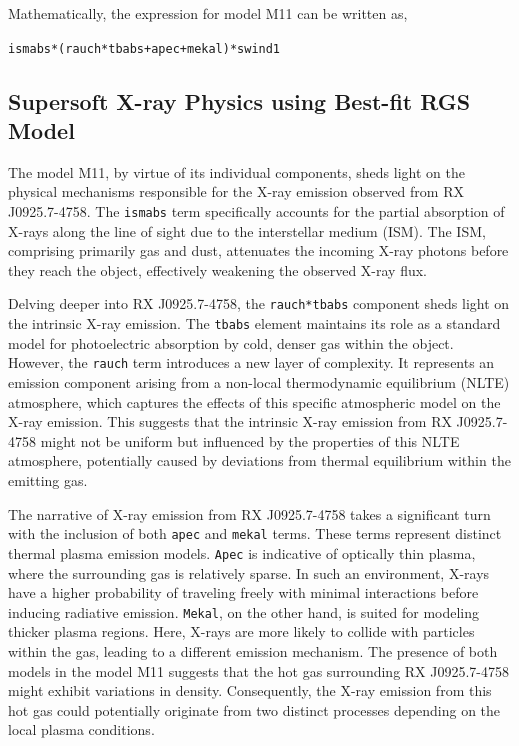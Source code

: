 			Mathematically, the expression for model M11 can be written as,
			\begin{center}
				\texttt{ismabs*(rauch*tbabs+apec+mekal)*swind1}
			\end{center}
			
		\subsection{Supersoft X-ray Physics using Best-fit RGS Model}
			The model M11, by virtue of its individual components, sheds light on the physical mechanisms responsible for the X-ray emission observed from RX J0925.7-4758. The \texttt{ismabs} term specifically accounts for the partial absorption of X-rays along the line of sight due to the interstellar medium (ISM). The ISM, comprising primarily gas and dust, attenuates the incoming X-ray photons before they reach the object, effectively weakening the observed X-ray flux.
			
			Delving deeper into RX J0925.7-4758, the \texttt{rauch*tbabs} component sheds light on the intrinsic X-ray emission. The \texttt{tbabs} element maintains its role as a standard model for photoelectric absorption by cold, denser gas within the object. However, the \texttt{rauch} term introduces a new layer of complexity. It represents an emission component arising from a non-local thermodynamic equilibrium (NLTE) atmosphere, which captures the effects of this specific atmospheric model on the X-ray emission. This suggests that the intrinsic X-ray emission from RX J0925.7-4758 might not be uniform but influenced by the properties of this NLTE atmosphere, potentially caused by deviations from thermal equilibrium within the emitting gas.
			
			The narrative of X-ray emission from RX J0925.7-4758 takes a significant turn with the inclusion of both \texttt{apec} and \texttt{mekal} terms. These terms represent distinct thermal plasma emission models. \texttt{Apec} is indicative of optically thin plasma, where the surrounding gas is relatively sparse. In such an environment, X-rays have a higher probability of traveling freely with minimal interactions before inducing radiative emission. \texttt{Mekal}, on the other hand, is suited for modeling thicker plasma regions. Here, X-rays are more likely to collide with particles within the gas, leading to a different emission mechanism. The presence of both models in the model M11 suggests that the hot gas surrounding RX J0925.7-4758 might exhibit variations in density. Consequently, the X-ray emission from this hot gas could potentially originate from two distinct processes depending on the local plasma conditions.
			
